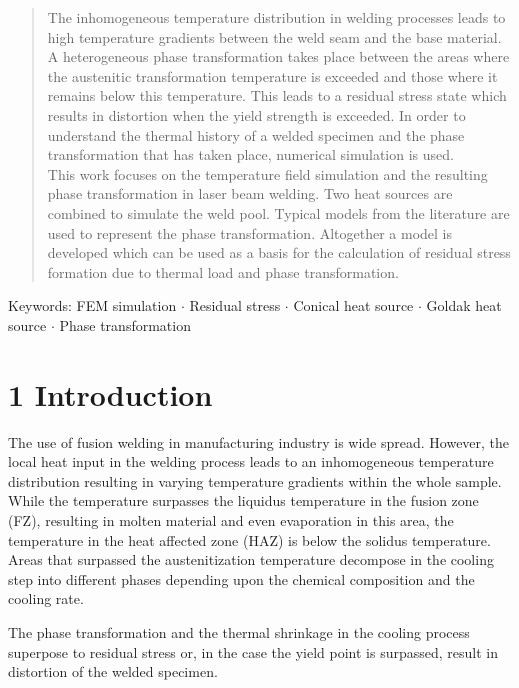 \documentclass[10pt]{article}
\begin{document}
\begin{abstract}
The inhomogeneous temperature distribution in welding processes leads to high temperature gradients between the weld seam and the base material. A heterogeneous phase transformation takes place between the areas where the austenitic transformation temperature is exceeded and those where it remains below this temperature. This leads to a residual stress state which results in distortion when the yield strength is exceeded. In order to understand the thermal history of a welded specimen and the phase transformation that has taken place, numerical simulation is used.\\
This work focuses on the temperature field simulation and the resulting phase transformation in laser beam welding. Two heat sources are combined to simulate the weld pool. Typical models from the literature are used to represent the phase transformation. Altogether a model is developed which can be used as a basis for the calculation of residual stress formation due to thermal load and phase transformation.
\end{abstract}

Keywords: FEM simulation $\cdot$ Residual stress $\cdot$ Conical heat source $\cdot$ Goldak heat source $\cdot$ Phase transformation

\section*{1 Introduction}
The use of fusion welding in manufacturing industry is wide spread. However, the local heat input in the welding process leads to an inhomogeneous temperature distribution resulting in varying temperature gradients within the whole sample. While the temperature surpasses the liquidus temperature in the fusion zone (FZ), resulting in molten material and even evaporation in this area, the temperature in the heat affected zone (HAZ) is below the solidus temperature. Areas that surpassed the austenitization temperature decompose in the cooling step into different phases depending upon the chemical composition and the cooling rate.

The phase transformation and the thermal shrinkage in the cooling process superpose to residual stress or, in the case the yield point is surpassed, result in distortion of the welded specimen.
\end{document}
